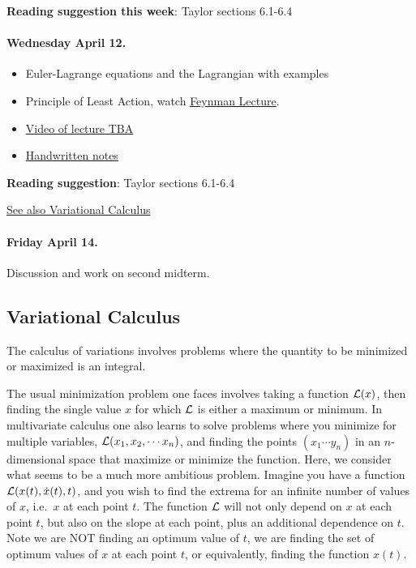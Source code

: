 \documentclass[%
oneside,                 %
final,                   %
10pt]{article}
\begin{document}
\noindent
\textbf{Reading suggestion this week}: Taylor sections 6.1-6.4

\paragraph{Wednesday April 12.}
\begin{itemize}
\item Euler-Lagrange equations and the Lagrangian with examples

\item Principle of Least Action, watch \href{{https://www.feynmanlectures.caltech.edu/II_19.html}}{Feynman Lecture}.

\item \href{{https://youtu.be/}}{Video of lecture TBA}

\item \href{{https://github.com/mhjensen/Physics321/blob/master/doc/HandWrittenNotes/Spring2023/NotesApril12.pdf}}{Handwritten notes}
\end{itemize}

\noindent
\textbf{Reading suggestion}: Taylor sections 6.1-6.4

\href{{https://en.wikipedia.org/wiki/Calculus_of_variations}}{See also Variational Calculus}

\paragraph{Friday April 14.}
Discussion and work on second midterm. 

\subsection*{Variational Calculus}

The calculus of variations involves 
problems where the quantity to be minimized or maximized is an integral. 

The usual minimization problem one faces involves taking a function
${\cal L}(x)$, then finding the single value $x$ for which ${\cal L}$
is either a maximum or minimum. In multivariate calculus one also
learns to solve problems where you minimize for multiple variables,
${\cal L}(x_1,x_2,\cdots x_n)$, and finding the points $(x_1\cdots
y_n)$ in an $n$-dimensional space that maximize or minimize the
function. Here, we consider what seems to be a much more ambitious
problem. Imagine you have a function ${\cal L}(x(t),\dot{x}(t),t)$,
and you wish to find the extrema for an infinite number of values of
$x$, i.e.~$x$ at each point $t$. The function ${\cal L}$ will not only
depend on $x$ at each point $t$, but also on the slope at each point,
plus an additional dependence on $t$. Note we are NOT finding an
optimum value of $t$, we are finding the set of optimum values of $x$
at each point $t$, or equivalently, finding the function $x(t)$.
\end{document}

